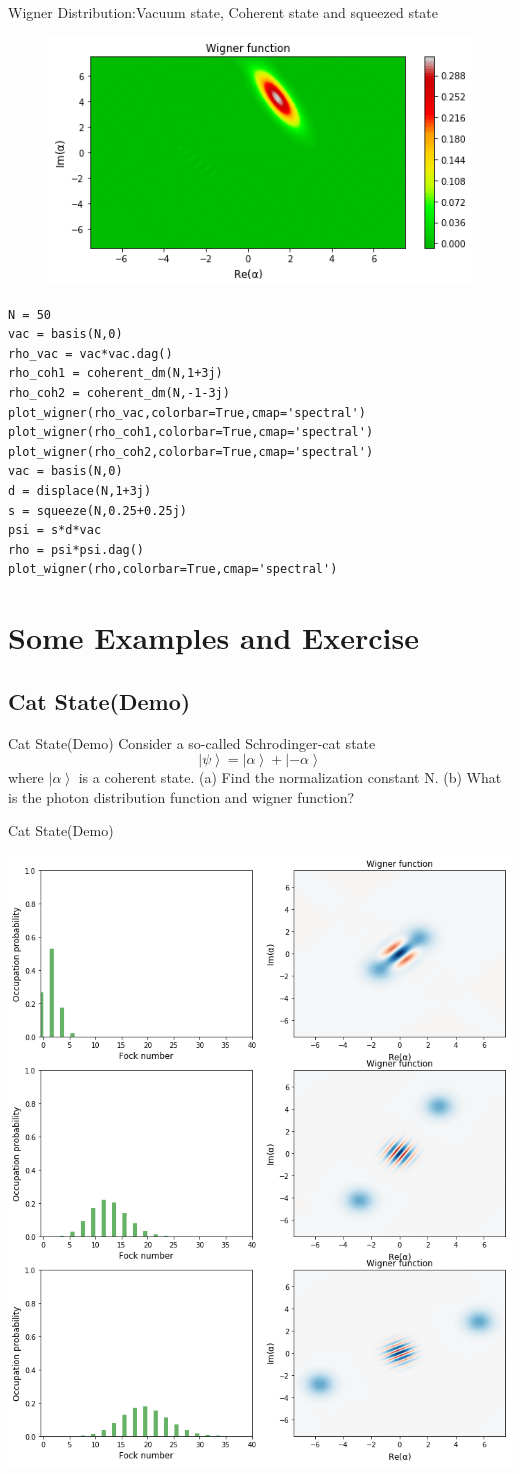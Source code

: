 \documentclass{beamer}
\begin{document}
\begin{frame}{Wigner Distribution:Vacuum state, Coherent state and squeezed state}
\begin{figure}
{\begin{minipage}[b]{0.4\textwidth}
			\includegraphics[width=1\textwidth]{9}
		\end{minipage}
	}
\end{figure}
\end{frame}
\begin{lstlisting}
N = 50
vac = basis(N,0)
rho_vac = vac*vac.dag()
rho_coh1 = coherent_dm(N,1+3j)
rho_coh2 = coherent_dm(N,-1-3j)
plot_wigner(rho_vac,colorbar=True,cmap='spectral')
plot_wigner(rho_coh1,colorbar=True,cmap='spectral')
plot_wigner(rho_coh2,colorbar=True,cmap='spectral')
vac = basis(N,0)
d = displace(N,1+3j)
s = squeeze(N,0.25+0.25j)
psi = s*d*vac
rho = psi*psi.dag()
plot_wigner(rho,colorbar=True,cmap='spectral')
\end{lstlisting}
\section{Some Examples and Exercise}
\subsection{Cat State(Demo)}
\begin{frame}{Cat State(Demo)}
Consider a so-called Schrodinger-cat state
\[\left| \psi  \right\rangle  = \left| \alpha  \right\rangle  + \left| { - \alpha } \right\rangle \]
where $\left| \alpha  \right\rangle $ is a coherent state. (a) Find the normalization constant N. (b)
What is the photon distribution function and wigner function?
\end{frame}
\begin{frame}{Cat State(Demo)}
\begin{center}
	\includegraphics[width=0.4\linewidth]{screenshot007}
\end{center}


\end{frame}
\end{document}
